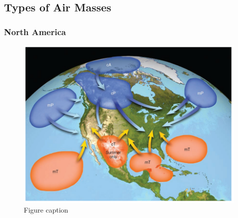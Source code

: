 \documentclass[12pt,oneside]{book}
\begin{document}
\subsection{Types of Air Masses}\label{types-of-air-masses}

\subsubsection{North America}\label{north-america}

\begin{figure}

{\centering \includegraphics[width=0.8\linewidth]{figures/Figure612a} 

}

\caption{Figure caption}\label{fig:Fig612a}
\end{figure}
\end{document}
